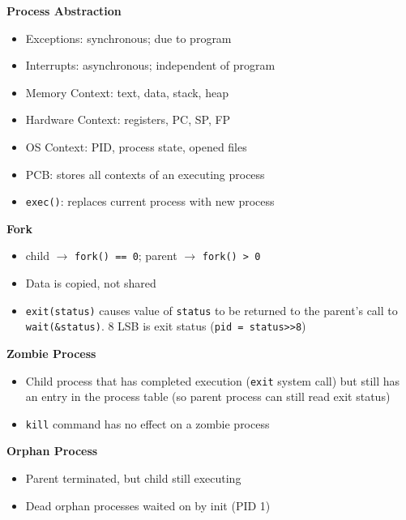 \documentclass[a4paper, 12pt]{article}
\begin{document}
\begin{multicols*}{4}
{\small\textbf{Process Abstraction}}
\begin{itemize}
	\item Exceptions: synchronous; due to program
	\item Interrupts: asynchronous; independent of program
	\item Memory Context: text, data, stack, heap
	\item Hardware Context: registers, PC, SP, FP
	\item OS Context: PID, process state, opened files
	\item PCB: stores all contexts of an executing process
	\item \texttt{exec()}: replaces current process with new process
\end{itemize}
\textbf{Fork}
\begin{itemize}
	\item child $\rightarrow$ \texttt{fork() == 0}; parent $\rightarrow$ \texttt{fork() > 0}
	\item Data is copied, not shared
\end{itemize}
\begin{itemize}
	\item \texttt{exit(status)} causes value of \texttt{status} to be returned to the parent's call to \texttt{wait(\&status)}. 8 LSB is exit status (\texttt{pid = status>>8})
\end{itemize}
\textbf{Zombie Process}
\begin{itemize}
	\item Child process that has completed execution (\texttt{exit} system call) but still has an entry in the process table (so parent process can still read exit status)
	\item \texttt{kill} command has no effect on a zombie process
\end{itemize}
\textbf{Orphan Process}
\begin{itemize}
	\item Parent terminated, but child still executing
	\item Dead orphan processes waited on by init (PID 1)
\end{itemize}

\medskip


\end{multicols*}
\end{document}
